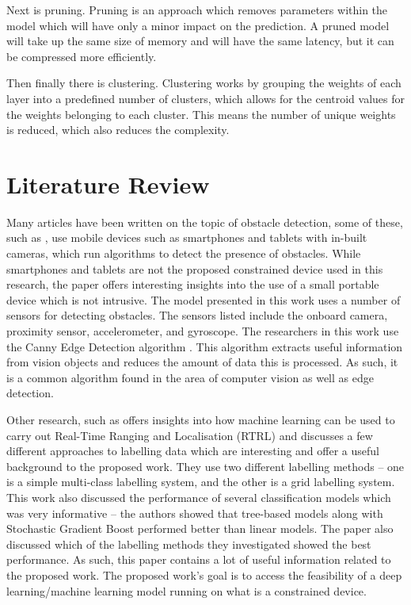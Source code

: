 \documentclass[conference]{IEEEtran}
\begin{document}
Next is pruning. Pruning is an approach which removes parameters within the model which will have only a minor impact on the prediction. A pruned model will take up the same size of memory and will have the same latency, but it can be compressed more efficiently.

Then finally there is clustering. Clustering works by grouping the weights of each layer into a predefined number of clusters, which allows for the centroid values for the weights belonging to each cluster. This means the number of unique weights is reduced, which also reduces the complexity.

\section{Literature Review}
Many articles have been written on the topic of obstacle detection, some of these, such as \cite{b15}, use mobile devices such as smartphones and tablets with in-built cameras, which run algorithms to detect the presence of obstacles. While smartphones and tablets are not the proposed constrained device used in this research, the paper offers interesting insights into the use of a small portable device which is not intrusive. The model presented in this work uses a number of sensors for detecting obstacles. The sensors listed include the onboard camera, proximity sensor, accelerometer, and gyroscope. The researchers in this work use the Canny Edge Detection algorithm \cite{b16}. This algorithm extracts useful information from vision objects and reduces the amount of data this is processed. As such, it is a common algorithm found in the area of computer vision as well as edge detection.

Other research, such as \cite{b17} offers insights into how machine learning can be used to carry out Real-Time Ranging and Localisation (RTRL) and discusses a few different approaches to labelling data which are interesting and offer a useful background to the proposed work. They use two different labelling methods – one is a simple multi-class labelling system, and the other is a grid labelling system. This work also discussed the performance of several classification models which was very informative – the authors showed that tree-based models along with Stochastic Gradient Boost performed better than linear models. The paper also discussed which of the labelling methods they investigated showed the best performance. As such, this paper contains a lot of useful information related to the proposed work.
The proposed work’s goal is to access the feasibility of a deep learning/machine learning model running on what is a constrained device. 
\end{document}
